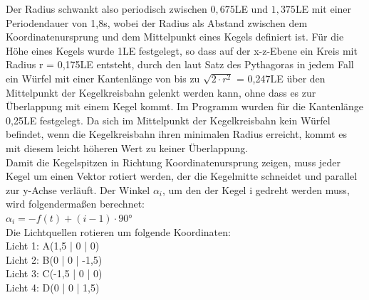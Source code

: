 \documentclass{scrartcl}
\begin{document}
            Der Radius schwankt also periodisch zwischen $0,675$LE und $1,375$LE mit einer Periodendauer von 1,8s, wobei der Radius als Abstand zwischen dem Koordinatenursprung und dem Mittelpunkt eines Kegels definiert ist.
            Für die Höhe eines Kegels wurde 1LE festgelegt, so dass auf der x-z-Ebene ein Kreis mit Radius r = 0,175LE entsteht, durch den laut Satz des Pythagoras in jedem Fall ein Würfel mit einer Kantenlänge von bis zu
            $\sqrt{2\cdot r^2}$ = 0,247LE über den Mittelpunkt der Kegelkreisbahn gelenkt werden kann, ohne dass es zur Überlappung mit einem Kegel kommt. Im Programm wurden für die Kantenlänge 0,25LE festgelegt.
            Da sich im Mittelpunkt der Kegelkreisbahn kein Würfel befindet, wenn die Kegelkreisbahn ihren minimalen Radius erreicht, kommt es mit diesem leicht höheren Wert zu keiner Überlappung.\\
            Damit die Kegelspitzen in Richtung Koordinatenursprung zeigen, muss jeder Kegel um einen Vektor rotiert werden, der die Kegelmitte schneidet und parallel zur y-Achse verläuft.
            Der Winkel $\alpha_i$, um den der Kegel i gedreht werden muss, wird folgendermaßen berechnet: \\
            $\alpha_i = -f(t) + (i-1)\cdot \ang{90}$ \\
            
            Die Lichtquellen rotieren um folgende Koordinaten: \\
            Licht 1: A(1,5 | 0 | 0) \\
            Licht 2: B(0 | 0 | -1,5) \\
            Licht 3: C(-1,5 | 0 | 0) \\
            Licht 4: D(0 | 0 | 1,5) \\
\end{document}
